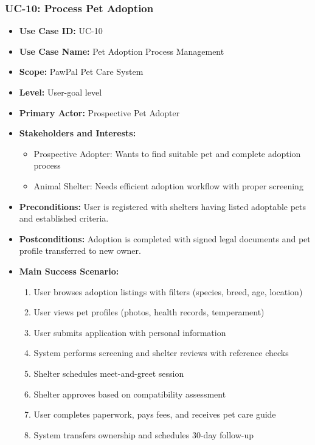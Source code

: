 \subsubsection*{UC-10: Process Pet Adoption}
\begin{itemize}
    \item \textbf{Use Case ID:} UC-10
    \item \textbf{Use Case Name:} Pet Adoption Process Management
    \item \textbf{Scope:} PawPal Pet Care System
    \item \textbf{Level:} User-goal level
    \item \textbf{Primary Actor:} Prospective Pet Adopter
    \item \textbf{Stakeholders and Interests:}
    \begin{itemize}
        \item Prospective Adopter: Wants to find suitable pet and complete adoption process
        \item Animal Shelter: Needs efficient adoption workflow with proper screening
    \end{itemize}
    \item \textbf{Preconditions:} User is registered with shelters having listed adoptable pets and established criteria.
    \item \textbf{Postconditions:} Adoption is completed with signed legal documents and pet profile transferred to new owner.
    \item \textbf{Main Success Scenario:}
    \begin{enumerate}
        \item User browses adoption listings with filters (species, breed, age, location)
        \item User views pet profiles (photos, health records, temperament)
        \item User submits application with personal information
        \item System performs screening and shelter reviews with reference checks
        \item Shelter schedules meet-and-greet session
        \item Shelter approves based on compatibility assessment
        \item User completes paperwork, pays fees, and receives pet care guide
        \item System transfers ownership and schedules 30-day follow-up
    \end{enumerate}

\end{itemize}
